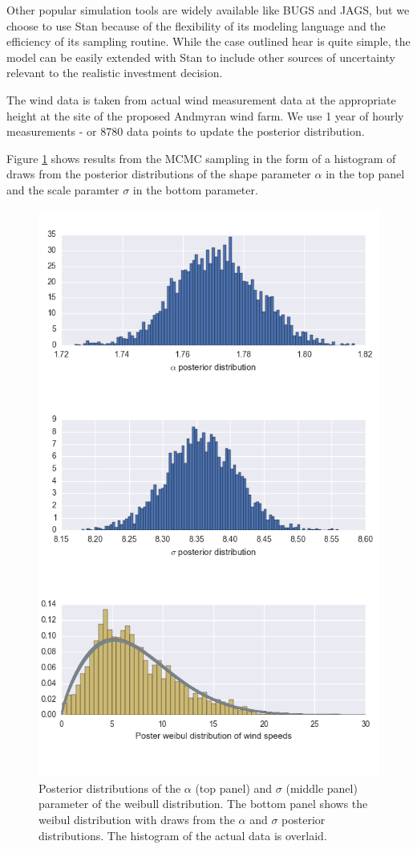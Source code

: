 \documentclass[11pt]{article}
\begin{document}
Other popular simulation tools are widely available like BUGS and JAGS, but we choose to use Stan because of the flexibility of its modeling language and the efficiency of its sampling routine. While the case outlined hear is quite simple, the model can be easily extended with Stan to include other sources of uncertainty relevant to the realistic investment decision.

The wind data is taken from actual wind measurement data at the appropriate height at the site of the proposed Andmyran wind farm. We use 1 year of hourly measurements - or 8780 data points to update the posterior distribution. 

Figure \ref{posteriors} shows results from the MCMC sampling in the form of a histogram of draws from the posterior distributions of the shape parameter $\alpha$ in the top panel and the scale paramter $\sigma$ in the bottom parameter.

\begin{figure}
	\centering
	\includegraphics[width=.6\textwidth]{figures/posteriors.png}
	\caption{Posterior distributions of the $\alpha$ (top panel) and $\sigma$ (middle panel) parameter of the weibull distribution. The bottom panel shows the weibul distribution with draws from the $\alpha$ and $\sigma$ posterior distributions. The histogram of the actual data is overlaid.}
	\label{posteriors}
\end{figure}
\end{document}
